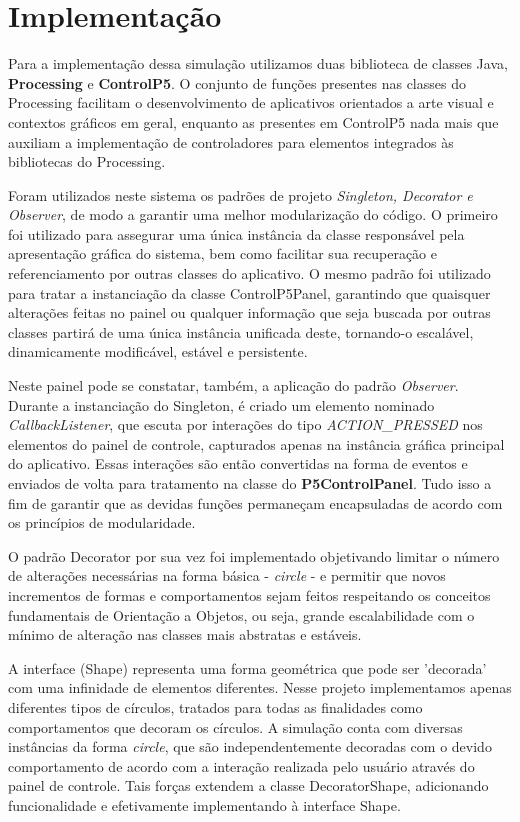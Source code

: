 \documentclass[12pt]{article}
\begin{document}
\section{Implementação}
\label{implementacao}

Para a implementação dessa simulação utilizamos duas biblioteca de classes Java, \textbf{Processing} e \textbf{ControlP5}. O conjunto de
funções presentes nas classes do Processing facilitam o desenvolvimento de aplicativos orientados a arte visual e contextos gráficos em geral,
enquanto as presentes em ControlP5 nada mais que auxiliam a implementação de controladores para elementos integrados às bibliotecas do Processing. 

Foram utilizados neste sistema os padrões de projeto \textit{Singleton, Decorator e Observer}, de modo a garantir uma melhor modularização do código.
O primeiro foi utilizado para assegurar uma única instância da classe responsável pela apresentação gráfica do sistema, bem como facilitar sua
recuperação e referenciamento por outras classes do aplicativo. O mesmo padrão foi utilizado para tratar a instanciação da classe ControlP5Panel,
garantindo que quaisquer alterações feitas no painel ou qualquer informação que seja buscada por outras classes partirá de uma única instância
unificada deste, tornando-o escalável, dinamicamente modificável, estável e persistente. 

Neste painel pode se constatar, também, a aplicação do padrão \textit{Observer}. Durante a instanciação do Singleton, é criado um elemento nominado
\textit{CallbackListener}, que escuta por interações do tipo \textit{ACTION\_PRESSED} nos elementos do painel de controle, capturados apenas na instância gráfica
principal do aplicativo. Essas interações são então convertidas na forma de eventos e enviados de volta para tratamento na classe do \textbf{P5ControlPanel}.
Tudo isso a fim de garantir que as devidas funções permaneçam encapsuladas de acordo com os princípios de modularidade.

O padrão Decorator por sua vez foi implementado objetivando limitar o número de alterações necessárias na forma básica - \textit{circle} - e
permitir que novos incrementos de formas e comportamentos sejam feitos respeitando os conceitos fundamentais de Orientação a Objetos, ou seja,
grande escalabilidade com o mínimo de alteração nas classes mais abstratas e estáveis. 

A interface (Shape) representa uma forma geométrica que pode ser 'decorada' com uma infinidade de elementos diferentes. Nesse projeto
implementamos apenas diferentes tipos de círculos, tratados para todas as finalidades como comportamentos que decoram os círculos. A simulação conta com
diversas instâncias da forma \textit{circle}, que são independentemente decoradas com o devido comportamento de acordo com a interação realizada pelo usuário
através do painel de controle. Tais forças extendem a classe DecoratorShape, adicionando funcionalidade e efetivamente implementando à interface Shape.
\end{document}
